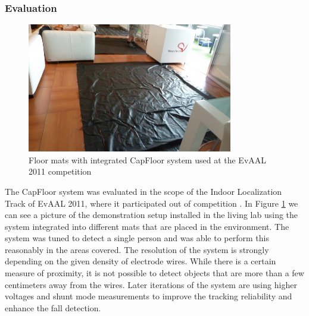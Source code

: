 \subsubsection{Evaluation}
\begin{figure}[h]
\centering
\includegraphics[width=0.8\textwidth]{images/capfloor_evaal}
\caption{Floor mats with integrated CapFloor system used at the EvAAL 2011 competition \cite{Braun2012CapFloor}}
\label{fig:capfloor_evaal}
\end{figure}
The CapFloor system was evaluated in the scope of the Indoor Localization Track of EvAAL 2011, where it participated out of competition \cite{chessa_eval}. In Figure \ref{fig:capfloor_evaal} we can see a picture of the demonstration setup installed in the living lab using the system integrated into different mats that are placed in the environment. The system was tuned to detect a single person and was able to perform this reasonably in the areas covered. The resolution of the system is strongly depending on the given density of electrode wires. While there is a certain measure of proximity, it is not possible to detect objects that are more than a few centimeters away from the wires. Later iterations of the system are using higher voltages and shunt mode measurements to improve the tracking reliability and enhance the fall detection.
